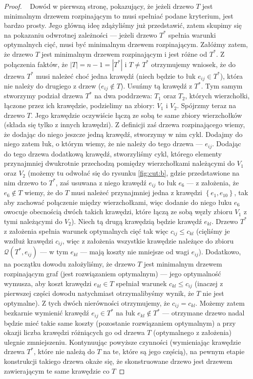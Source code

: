 \begin{proof}~\cite[$518$]{Ahuja:1993:NFT:137406}
	Dowód w pierwszą stronę, pokazujący, że jeżeli drzewo $T$ jest minimalnym drzewem rozpinającym to musi spełniać podane kryterium, jest bardzo prosty. Jego główną ideę zdążyliśmy już przedstawić, zatem skupimy się na pokazaniu odwrotnej zależności --- jeżeli drzewo $T^{\ast}$ spełnia warunki optymalnych cięć, musi być minimalnym drzewem rozpinającym. Załóżmy zatem, że drzewo $T$ jest minimalnym drzewem rozpinającym i jest różne od $T^{\ast}$. Z połączenia faktów, że $\left| T \right| = n - 1 = \left| T^{\ast} \right|$ i $T \neq T^{\ast}$ otrzymujemy wniosek, że do drzewa $T^{\ast}$ musi należeć choć jedna krawędź (niech będzie to łuk $e_{ij} \in T^{\ast}$), która nie należy do drugiego z drzew ($e_{ij} \notin T$). Usuńmy tą krawędź z $T^{\ast}$. Tym samym stworzymy podział drzewa $T^{\ast}$ na dwa poddrzewa: $T_{1}$ oraz $T_{2}$, których wierzchołki, łączone przez ich krawędzie, podzielimy na zbiory: $V_{1}$ i $V_{2}$. Spójrzmy teraz na drzewo $T$. Jego krawędzie oczywiście łączą ze sobą te same zbiory wierzchołków (składa się tylko z innych krawędzi). Z definicji zaś drzewa rozpinającego wiemy, że dodając do niego jeszcze jedną krawędź, stworzymy w nim cykl. Dodajmy do niego zatem łuk, o którym wiemy, że nie należy do tego drzewa --- $e_{ij}$. Dodając do tego drzewa dodatkową krawędź, stworzyliśmy cykl, którego elementy przynajmniej dwukrotnie przechodzą pomiędzy wierzchołkami należącymi do $V_{1}$ oraz $V_{2}$ (możemy tu odwołać się do rysunku \ref{fig:cut:b}, gdzie przedstawione na nim drzewo to $T^{\ast}$, zaś usuwana z niego krawędź $e_{ij}$ to łuk $e_{6}$ --- z założenia, że $e_{6} \notin T$ wiemy, że do $T$ musi należeć przynajmniej jedna z krawędzi $\left\{ e_{1}, e_{10} \right\}$, tak aby zachować połączenie między wierzchołkami, więc dodanie do niego łuku $e_{6}$ owocuje obecnością dwóch takich krawędzi, które łączą ze sobą węzły zbioru $V_{1}$ z tymi należącymi do $V_{2}$). Niech tą drugą krawędzią będzie krawędź $e_{kl}$. Drzewo $T^{\ast}$ z założenia spełnia warunek optymalnych cięć tak więc $c_{ij} \leqslant c_{kl}$ (cięliśmy je wzdłuż krawędzi $c_{ij}$, więc z założenia wszystkie krawędzie należące do zbioru $\mathcal{Q} \left( T^{\ast}, e_{ij} \right)$ --- w tym $e_{kl}$ --- mają koszty nie mniejsze od wagi $e_{ij}$). Dodatkowo, na początku dowodu założyliśmy, że drzewo $T$ jest minimalnym drzewem rozpinającym graf (jest rozwiązaniem optymalnym) --- jego optymalność wymusza, aby koszt krawędzi $e_{kl} \in T$ spełniał warunek $c_{kl} \leqslant c_{ij}$ (inaczej z pierwszej części dowodu natychmiast otrzymalibyśmy wynik, że $T$ nie jest optymalne). Z tych dwóch nierówności otrzymujemy, że $c_{ij} = c_{kl}$. Możemy zatem bezkarnie wymienić krawędź $e_{ij} \in T^{\ast}$ na łuk $e_{kl} \notin T^{\ast}$ --- otrzymane drzewo nadal będzie mieć takie same koszty (pozostanie rozwiązaniem optymalnym) a przy okazji liczba krawędzi różniących go od drzewa $T$ (optymalnego z założenia) ulegnie zmniejszeniu. Kontynuując powyższe czynności (wymieniając krawędzie drzewa $T^{\ast}$, które nie należą do $T$ na te, które są jego częścią), na pewnym etapie konstrukcji takiego drzewa okaże się, że skonstruowane drzewo jest drzewem zawierającym te same krawędzie co $T$ 
\end{proof}

